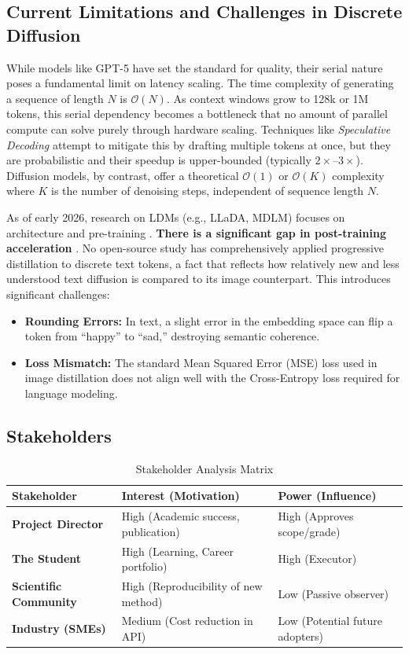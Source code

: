 \documentclass[11pt, a4paper]{article}
\begin{document}
\subsection{Current Limitations and Challenges in Discrete Diffusion}
While models like GPT-5 have set the standard for quality, their serial nature poses a fundamental limit on latency scaling. The time complexity of generating a sequence of length $N$ is $\mathcal{O}(N)$. As context windows grow to 128k or 1M tokens, this serial dependency becomes a bottleneck that no amount of parallel compute can solve purely through hardware scaling. Techniques like \textit{Speculative Decoding} attempt to mitigate this by drafting multiple tokens at once, but they are probabilistic and their speedup is upper-bounded (typically $2\times$--$3\times$). Diffusion models, by contrast, offer a theoretical $\mathcal{O}(1)$ or $\mathcal{O}(K)$ complexity where $K$ is the number of denoising steps, independent of sequence length $N$.

As of early 2026, research on LDMs (e.g., LLaDA, MDLM) focuses on architecture and pre-training \cite{survey2025diffusion}. \textbf{There is a significant gap in post-training acceleration} \cite{li2024accelerating}. No open-source study has comprehensively applied progressive distillation to discrete text tokens, a fact that reflects how relatively new and less understood text diffusion is compared to its image counterpart. This introduces significant challenges:
\begin{itemize}
    \item \textbf{Rounding Errors:} In text, a slight error in the embedding space can flip a token from ``happy'' to ``sad,'' destroying semantic coherence.
    \item \textbf{Loss Mismatch:} The standard Mean Squared Error (MSE) loss used in image distillation does not align well with the Cross-Entropy loss required for language modeling.
\end{itemize}

\subsection{Stakeholders}
\label{sec:stakeholders}
\begin{table}[H]
\centering
\caption{Stakeholder Analysis Matrix}
\label{tab:stakeholders}
\begin{tabular}{@{}lp{4cm}p{4cm}@{}}
\toprule
\textbf{Stakeholder} & \textbf{Interest (Motivation)} & \textbf{Power (Influence)} \\ \midrule
\textbf{Project Director} & High (Academic success, publication) & High (Approves scope/grade) \\
\textbf{The Student} & High (Learning, Career portfolio) & High (Executor) \\
\textbf{Scientific Community} & High (Reproducibility of new method) & Low (Passive observer) \\
\textbf{Industry (SMEs)} & Medium (Cost reduction in API) & Low (Potential future adopters) \\ \bottomrule
\end{tabular}
\end{table}
\end{document}
